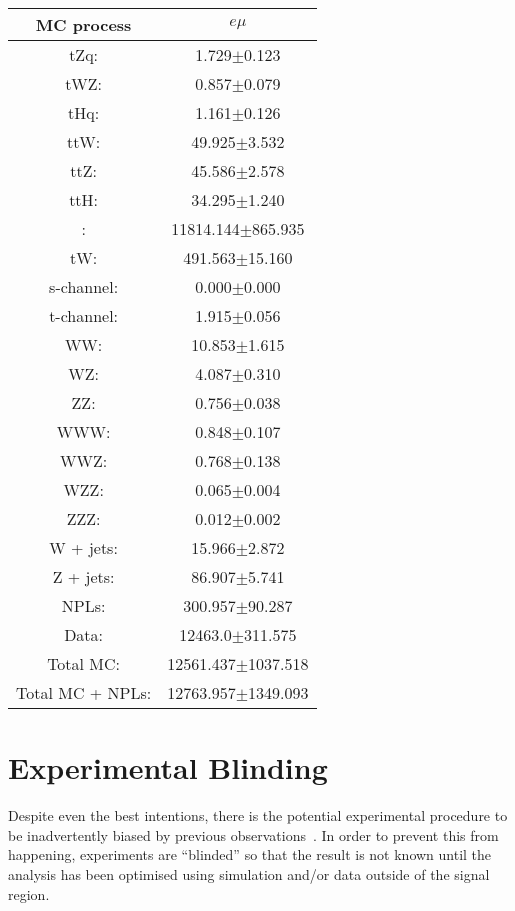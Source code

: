 \begin{table}[htbp]
\label{tab:ttbarCR}
  \centering
 \begin{tabular}{cc}
   \hline
   \textbf{MC process} & \textbf{$e\mu$}  \\
   \hline
	tZq\@: & 1.729$\pm$0.123  \\
	tWZ\@: & 0.857$\pm$0.079  \\
	tHq\@: & 1.161$\pm$0.126  \\
	ttW\@: & 49.925$\pm$3.532   \\
	ttZ\@: & 45.586$\pm$2.578   \\
	ttH\@: & 34.295$\pm$1.240  \\
	\ttbar: & 11814.144$\pm$865.935   \\
	tW\@: & 491.563$\pm$15.160   \\
	s-channel\@: &  0.000$\pm$0.000 \\
	t-channel\@: & 1.915$\pm$0.056 \\
	WW\@: & 10.853$\pm$1.615  \\
	WZ\@: & 4.087$\pm$0.310 \\
	ZZ\@: & 0.756$\pm$0.038 \\
	WWW\@: & 0.848$\pm$0.107     \\
	WWZ\@: & 0.768$\pm$0.138     \\
	WZZ\@: & 0.065$\pm$0.004     \\
	ZZZ\@: & 0.012$\pm$0.002     \\
	W + jets\@: & 15.966$\pm$2.872     \\
	Z + jets\@: & 86.907$\pm$5.741     \\
	NPLs\@: & 300.957$\pm$90.287     \\
	\hline
	Data\@: & 12463.0$\pm$311.575     \\
	\hline
	Total MC\@: & 12561.437$\pm$1037.518     \\
	Total MC + NPLs\@: & 12763.957$\pm$1349.093     \\
   \hline
 \end{tabular}
\end{table}

\section{Experimental Blinding}\label{sec:blinding}
Despite even the best intentions, there is the potential experimental procedure to be inadvertently biased by previous observations~\cite{Roodman:2003rw}.
In order to prevent this from happening, experiments are ``blinded'' so that the result is not known until the analysis has been optimised using simulation and/or data outside of the signal region.


